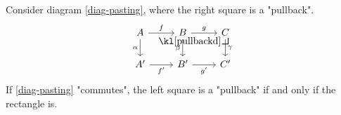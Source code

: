 \documentclass[main.tex]{subfiles}
\begin{document}
\begin{thm}
    Consider diagram \eqref{diag-pasting}, where the right square is a "pullback".
    \begin{equation}\label{diag-pasting}
        \begin{tikzcd}
            A \arrow[r, "f"] \arrow[d, "\alpha"'] & B \arrow[r, "g"] \arrow[d, "\beta"'] \arrow[rd, phantom ,"\pullbackd", very near start] & C \arrow[d, "\gamma"] \\
            A' \arrow[r, "f'"']                   & B' \arrow[r, "g'"']                                                      & C'                   
        \end{tikzcd}       
    \end{equation}
    If \eqref{diag-pasting} "commutes", the left square is a "pullback" if and only if the rectangle is.
\end{thm}
\end{document}
